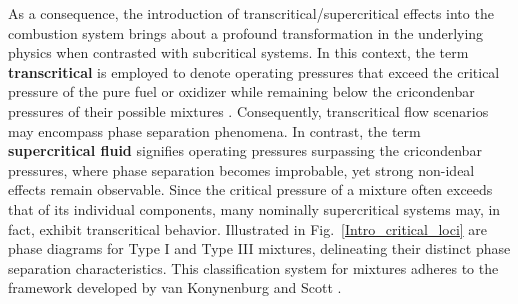 


As a consequence, the introduction of transcritical/supercritical effects into the combustion system brings about a profound transformation in the underlying physics when contrasted with subcritical systems. In this context, the term \textbf{transcritical} is employed to denote operating pressures that exceed the critical pressure of the pure fuel or oxidizer while remaining below the cricondenbar pressures of their possible mixtures \cite{fathi2022large}. Consequently, transcritical flow scenarios may encompass phase separation phenomena. In contrast, the term \textbf{supercritical fluid} signifies operating pressures surpassing the cricondenbar pressures, where phase separation becomes improbable, yet strong non-ideal effects remain observable. Since the critical pressure of a mixture often exceeds that of its individual components, many nominally supercritical systems may, in fact, exhibit transcritical behavior. Illustrated in Fig.~\ref{Intro_critical_loci} are phase diagrams for Type I and Type III mixtures, delineating their distinct phase separation characteristics. This classification system for mixtures adheres to the framework developed by van Konynenburg and Scott \cite{van1980critical}.

